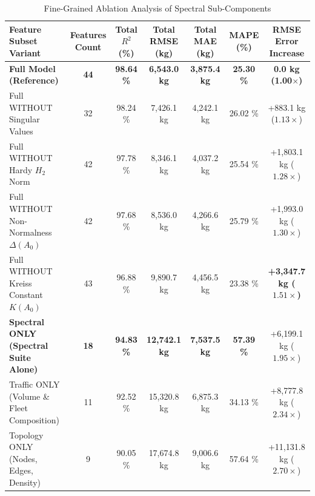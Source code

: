 \documentclass[lettersize,journal]{IEEEtran}
\begin{document}
\begin{table}[htbp]
\caption{Fine-Grained Ablation Analysis of Spectral Sub-Components}
\label{tab:fine_ablation}
\centering
\begin{tabular}{lcccccc}
\toprule
Feature Subset Variant & Features Count & Total $R^2$ (\%) & Total RMSE (kg) & Total MAE (kg) & MAPE (\%) & RMSE Error Increase \\
\midrule
\textbf{Full Model (Reference)} & \textbf{44} & \textbf{98.64 \%} & \textbf{6,543.0 kg} & \textbf{3,875.4 kg} & \textbf{25.30 \%} & \textbf{0.0 kg (1.00$\times$)} \\
Full WITHOUT Singular Values & 32 & 98.24 \% & 7,426.1 kg & 4,242.1 kg & 26.02 \% & +883.1 kg ($1.13\times$) \\
Full WITHOUT Hardy $H_2$ Norm & 42 & 97.78 \% & 8,346.1 kg & 4,037.2 kg & 25.54 \% & +1,803.1 kg ($1.28\times$) \\
Full WITHOUT Non-Normalness $\Delta(A_0)$ & 42 & 97.68 \% & 8,536.0 kg & 4,266.6 kg & 25.79 \% & +1,993.0 kg ($1.30\times$) \\
Full WITHOUT Kreiss Constant $K(A_0)$ & 43 & 96.88 \% & 9,890.7 kg & 4,456.5 kg & 23.38 \% & \textbf{+3,347.7 kg ($1.51\times$)} \\
\midrule
\textbf{Spectral ONLY (Spectral Suite Alone)} & \textbf{18} & \textbf{94.83 \%} & \textbf{12,742.1 kg} & \textbf{7,537.5 kg} & \textbf{57.39 \%} & +6,199.1 kg ($1.95\times$) \\
Traffic ONLY (Volume \& Fleet Composition) & 11 & 92.52 \% & 15,320.8 kg & 6,875.3 kg & 34.13 \% & +8,777.8 kg ($2.34\times$) \\
Topology ONLY (Nodes, Edges, Density) & 9 & 90.05 \% & 17,674.8 kg & 9,006.6 kg & 57.64 \% & +11,131.8 kg ($2.70\times$) \\
\bottomrule
\end{tabular}
\end{table}
\end{document}
